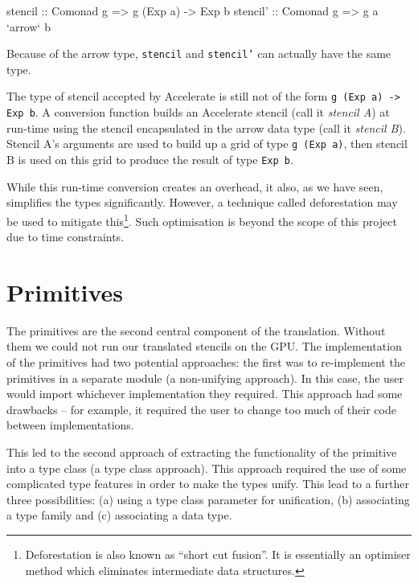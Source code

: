 \documentclass[12pt,a4paper,twoside]{scrbook}
\begin{document}
\begin{hflisting}[label={lst:arrow-sten}, caption=Here we see the type the
  stencil must have in Accelerate (\texttt{stencil}) and the type we can
  generalise to using the \texttt{arrow} type (\texttt{stencil'}).]
stencil :: Comonad g => g (Exp a) -> Exp b
stencil' :: Comonad g => g a `arrow` b
\end{hflisting}

Because of the arrow type, \texttt{stencil} and \texttt{stencil'} can
actually have the same type.

The type of stencil accepted by Accelerate is still not of the form \texttt{g
  (Exp a) -\textgreater{} Exp b}. A conversion function builds an Accelerate
stencil (call it \emph{stencil A}) at run-time using the stencil encapsulated in
the arrow data type (call it \emph{stencil B}). Stencil A's arguments are used
to build up a grid of type \texttt{g (Exp a)}, then stencil B is used on this
grid to produce the result of type \texttt{Exp b}.

While this run-time conversion creates an overhead, it also, as we have seen,
simplifies the types significantly. However, a technique called deforestation
may be used to mitigate this\footnote{Deforestation is also known as ``short cut
  fusion''. It is essentially an optimiser method which eliminates intermediate
  data structures.}. Such optimisation is beyond the scope of this project due
to time constraints.

\section{Primitives}
\label{sec:prims}

The primitives are the second central component of the translation.  Without
them we could not run our translated stencils on the GPU. The implementation of
the primitives had two potential approaches: the first was to re-implement the
primitives in a separate module (a non-unifying approach). In this case, the
user would import whichever implementation they required. This approach had some
drawbacks -- for example, it required the user to change too much of their code
between implementations.

This led to the second approach of extracting the functionality of the primitive
into a type class (a type class approach). This approach required the use of
some complicated type features in order to make the types unify. This lead to a
further three possibilities: (a) using a type class parameter for unification,
(b) associating a type family and (c) associating a data type.
\end{document}
